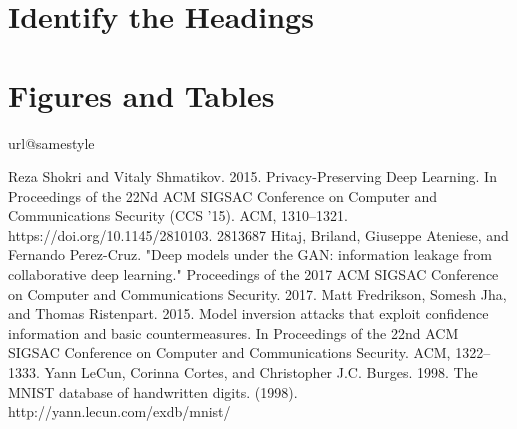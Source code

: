 \documentclass[conference]{IEEEtran}
\begin{document}
\section{Identify the Headings}


\section{Figures and Tables}



%
\begin{thebibliography}{10}
\providecommand{\url}[1]{#1}
\csname url@samestyle\endcsname
\providecommand{\newblock}{\relax}
\providecommand{\bibinfo}[2]{#2}
\providecommand{\BIBentrySTDinterwordspacing}{\spaceskip=0pt\relax}
\providecommand{\BIBentryALTinterwordstretchfactor}{4}
\providecommand{\BIBentryALTinterwordspacing}{\spaceskip=\fontdimen2\font plus
\BIBentryALTinterwordstretchfactor\fontdimen3\font minus
  \fontdimen4\font\relax}
\providecommand{\BIBforeignlanguage}[2]{{%
\expandafter\ifx\csname l@#1\endcsname\relax
\typeout{** WARNING: IEEEtran.bst: No hyphenation pattern has been}%
\typeout{** loaded for the language `#1'. Using the pattern for}%
\typeout{** the default language instead.}%
\else
\language=\csname l@#1\endcsname
\fi
#2}}
\providecommand{\BIBdecl}{\relax}
\BIBdecl

Reza Shokri and Vitaly Shmatikov. 2015. Privacy-Preserving Deep Learning.
In Proceedings of the 22Nd ACM SIGSAC Conference on Computer and Communications
Security (CCS ’15). ACM, 1310–1321. https://doi.org/10.1145/2810103.
2813687
Hitaj, Briland, Giuseppe Ateniese, and Fernando Perez-Cruz. "Deep models under the GAN: information leakage from collaborative deep learning." Proceedings of the 2017 ACM SIGSAC Conference on Computer and Communications Security. 2017.
Matt Fredrikson, Somesh Jha, and Thomas Ristenpart. 2015. Model inversion
attacks that exploit confidence information and basic countermeasures. In Proceedings
of the 22nd ACM SIGSAC Conference on Computer and Communications
Security. ACM, 1322–1333.
Yann LeCun, Corinna Cortes, and Christopher J.C. Burges. 1998. The MNIST
database of handwritten digits. (1998). http://yann.lecun.com/exdb/mnist/
\end{thebibliography}


\vspace{-0.4in}
\end{document}
